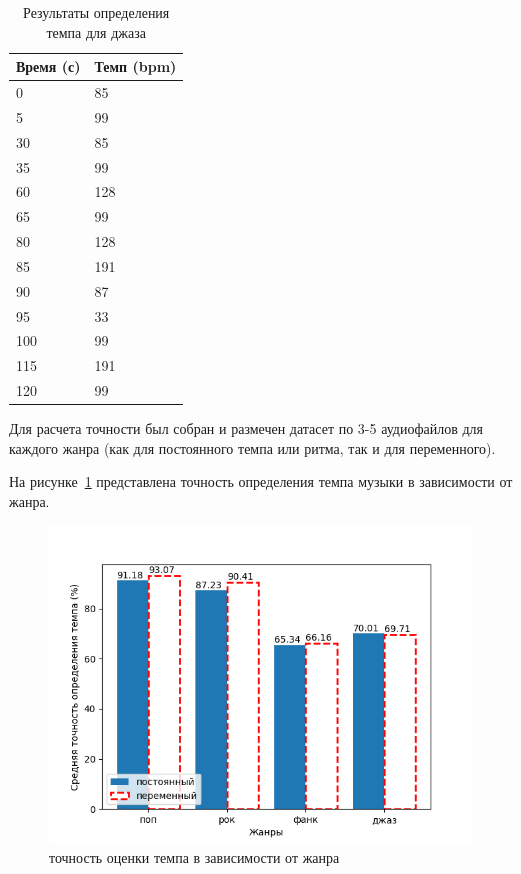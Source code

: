 \begin{table}[!h]
	\begin{center}
		\caption{\label{tab:tempo_jazz}Результаты определения темпа для джаза}
		\begin{tabular}{|p{8cm}|p{8cm}|}
			\hline
			\textbf{Время (с)} & \textbf{Темп (bpm)}\\
			\hline
			0 & 85\\
			\hline
			5 & 99\\
			\hline
			30 & 85\\
			\hline
			35 & 99\\
			\hline
			60 & 128\\
			\hline
			65 & 99\\
			\hline
			80 & 128\\
			\hline
			85 & 191\\
			\hline
			90 & 87\\
			\hline
			95 & 33\\
			\hline
			100 & 99\\
			\hline
			115 & 191\\
			\hline
			120 & 99\\
			\hline
		\end{tabular}
	\end{center}
\end{table}

\newpage

Для расчета точности был собран и размечен датасет по 3-5 аудиофайлов для каждого жанра (как для постоянного темпа или ритма, так и для переменного).

На рисунке~\ref{img:tempo_genres} представлена точность определения темпа музыки в зависимости от жанра.

\begin{figure}[h]
	\centering
	\includegraphics[scale=1]{../graphs/tempo_genres.png}
	\caption{точность оценки темпа в зависимости от жанра}
	\label{img:tempo_genres}
\end{figure}

